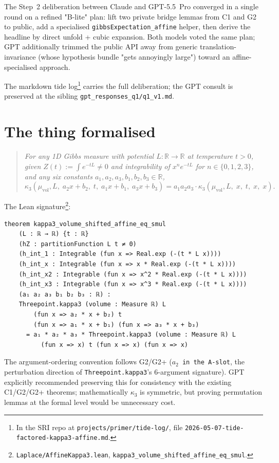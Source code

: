 \documentclass[11pt]{article}
\begin{document}
The Step~2 deliberation between Claude and GPT-5.5~Pro converged in a
single round on a refined "B-lite" plan: lift two private bridge
lemmas from C1 and G2 to public, add a specialised
\texttt{gibbsExpectation\_affine} helper, then derive the headline
by direct unfold + cubic expansion. Both models voted the same plan;
GPT additionally trimmed the public API away from generic
translation-invariance (whose hypothesis bundle "gets annoyingly
large") toward an affine-specialised approach.

The markdown tide log\footnote{In the SRI repo at
\texttt{projects/primer/tide-log/}, file
\texttt{2026-05-07-tide-factored-kappa3-affine.md}.} carries the full
deliberation; the GPT consult is preserved at the sibling
\texttt{gpt\_responses\_q1/q1\_v1.md}.

\section{The thing formalised}

\begin{quote}\itshape
For any 1D Gibbs measure with potential $L : \mathbb R \to \mathbb R$
at temperature $t > 0$, given $Z(t) := \int e^{-tL} \neq 0$ and
integrability of $x^n e^{-tL}$ for $n \in \{0,1,2,3\}$, and any six
constants $a_1, a_2, a_3, b_1, b_2, b_3 \in \mathbb R$,
$$
  \kappa_3(\mu_{\mathrm{vol}}, L,\;a_2 x + b_2,\;t,\;a_1 x + b_1,\;a_3 x + b_3)
  = a_1 a_2 a_3 \cdot \kappa_3(\mu_{\mathrm{vol}}, L,\;x,\;t,\;x,\;x).
$$
\end{quote}

\noindent The Lean signature\footnote{\texttt{Laplace/AffineKappa3.lean},
\texttt{kappa3\_volume\_shifted\_affine\_eq\_smul}.}:

\begin{verbatim}
theorem kappa3_volume_shifted_affine_eq_smul
    (L : ℝ → ℝ) {t : ℝ}
    (hZ : partitionFunction L t ≠ 0)
    (h_int_1 : Integrable (fun x => Real.exp (-(t * L x))))
    (h_int_x : Integrable (fun x => x * Real.exp (-(t * L x))))
    (h_int_x2 : Integrable (fun x => x^2 * Real.exp (-(t * L x))))
    (h_int_x3 : Integrable (fun x => x^3 * Real.exp (-(t * L x))))
    (a₁ a₂ a₃ b₁ b₂ b₃ : ℝ) :
    Threepoint.kappa3 (volume : Measure ℝ) L
        (fun x => a₂ * x + b₂) t
        (fun x => a₁ * x + b₁) (fun x => a₃ * x + b₃)
      = a₁ * a₂ * a₃ * Threepoint.kappa3 (volume : Measure ℝ) L
          (fun x => x) t (fun x => x) (fun x => x)
\end{verbatim}

\noindent The argument-ordering convention follows G2/G2+ (\texttt{$a_2$
in the A-slot}, the perturbation direction of \texttt{Threepoint.kappa3}'s
6-argument signature). GPT explicitly recommended preserving this for
consistency with the existing C1/G2/G2+ theorems; mathematically
$\kappa_3$ is symmetric, but proving permutation lemmas at the formal
level would be unnecessary cost.
\end{document}

